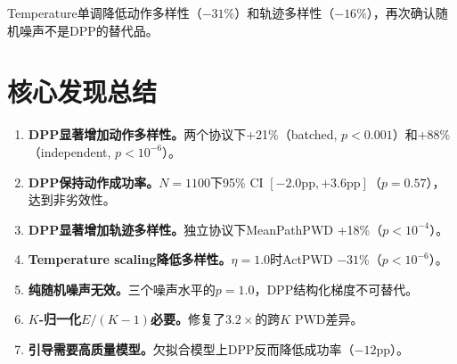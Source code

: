\documentclass[11pt]{article}
\begin{document}
Temperature单调降低动作多样性（$-31\%$）和轨迹多样性（$-16\%$），再次确认随机噪声不是DPP的替代品。

\section{核心发现总结}

\begin{enumerate}
\item \textbf{DPP显著增加动作多样性。}两个协议下+21\%（batched, $p<0.001$）和+88\%（independent, $p<10^{-6}$）。
\item \textbf{DPP保持动作成功率。}$N=1100$下95\% CI $[-2.0\text{pp}, +3.6\text{pp}]$（$p=0.57$），达到非劣效性。
\item \textbf{DPP显著增加轨迹多样性。}独立协议下MeanPathPWD +18\%（$p<10^{-4}$）。
\item \textbf{Temperature scaling降低多样性。}$\eta=1.0$时ActPWD $-31\%$（$p<10^{-6}$）。
\item \textbf{纯随机噪声无效。}三个噪声水平的$p=1.0$，DPP结构化梯度不可替代。
\item \textbf{$K$-归一化$E/(K-1)$必要。}修复了$3.2\times$的跨$K$ PWD差异。
\item \textbf{引导需要高质量模型。}欠拟合模型上DPP反而降低成功率（$-12$pp）。
\end{enumerate}
\end{document}
